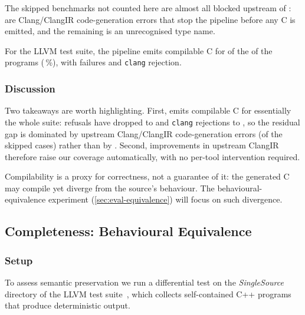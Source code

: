 The \esbmcSkipped skipped benchmarks not counted here are almost all blocked upstream of \toolcirc: \esbmcSkipCirGenError are Clang/ClangIR code-generation errors that stop the pipeline before any C is emitted, and the remaining \esbmcSkipUnknownType is an unrecognised type name. %

For the LLVM test suite, the pipeline emits compilable C for \llvmCompiles of the  of the \llvmAttempted programs (\llvmCompileShareAttempted\,\%), with \llvmFailMapper \toolcirc failures and \llvmFailCompile \texttt{clang} rejection. %


\subsubsection{Discussion}

Two takeaways are worth highlighting. %
First, \toolcirc emits compilable C for essentially the whole suite: \toolcirc refusals have dropped to \esbmcFailMapper and \texttt{clang} rejections to \esbmcFailCompile, so the residual gap is dominated by upstream Clang/ClangIR code-generation errors (\esbmcSkipCirGenError of the \esbmcSkipped skipped cases) rather than by \toolcirc. %
Second, improvements in upstream ClangIR therefore raise our coverage automatically, with no per-tool intervention required. %

Compilability is a proxy for correctness, not a guarantee of it: the generated C may compile yet diverge from the source's behaviour. %
The behavioural-equivalence experiment (\autoref{sec:eval-equivalence}) will focus on such divergence. %

\subsection{Completeness: Behavioural Equivalence}\label{sec:eval-equivalence}

\subsubsection{Setup}

To assess semantic preservation we run a differential test on the \emph{SingleSource} directory of the LLVM test suite~\cite{llvmtestsuite}, which collects \llvmTotal self-contained C++ programs that produce deterministic output. %

